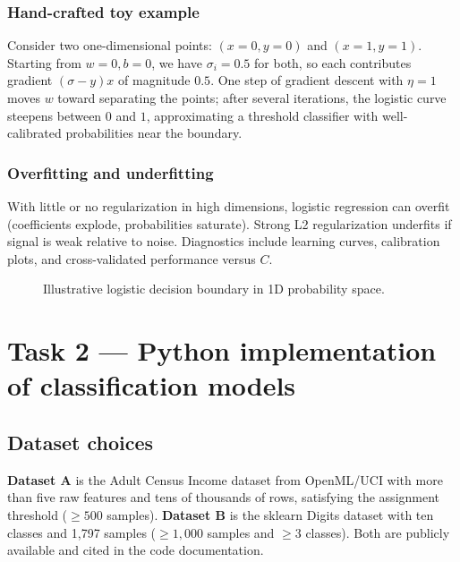 \documentclass[11pt,a4paper]{article}
\begin{document}
\subsubsection{Hand-crafted toy example}
Consider two one-dimensional points: $(x{=}0, y{=}0)$ and $(x{=}1, y{=}1)$. Starting from $w{=}0, b{=}0$, we have $\sigma_i{=}0.5$ for both, so each contributes gradient $(\sigma{-}y)x$ of magnitude $0.5$. One step of gradient descent with $\eta{=}1$ moves $w$ toward separating the points; after several iterations, the logistic curve steepens between $0$ and $1$, approximating a threshold classifier with well-calibrated probabilities near the boundary.

\subsubsection{Overfitting and underfitting}
With little or no regularization in high dimensions, logistic regression can overfit (coefficients explode, probabilities saturate). Strong L2 regularization underfits if signal is weak relative to noise. Diagnostics include learning curves, calibration plots, and cross-validated performance versus $C$.

\begin{figure}[htbp]
\centering
{}
\caption{Illustrative logistic decision boundary in 1D probability space.}
\label{fig:logreg-toy}
\end{figure}

\newpage
\section{Task 2 --- Python implementation of classification models}

\subsection{Dataset choices}
\textbf{Dataset A} is the Adult Census Income dataset from OpenML/UCI with more than five raw features and tens of thousands of rows, satisfying the assignment threshold ($\geq 500$ samples). \textbf{Dataset B} is the sklearn Digits dataset with ten classes and 1{,}797 samples ($\geq 1{,}000$ samples and $\geq 3$ classes). Both are publicly available and cited in the code documentation.
\end{document}

